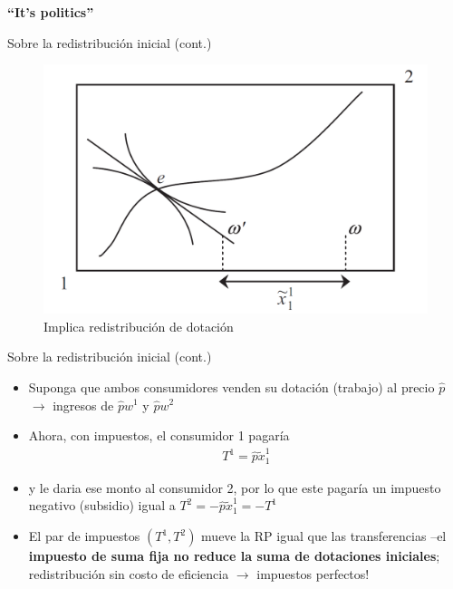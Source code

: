 \documentclass[
  ignorenonframetext,
]{beamer}
\providecommand{\tightlist}{%
  \setlength{\itemsep}{0pt}\setlength{\parskip}{0pt}}\usepackage{longtable,booktabs,array}
\begin{document}
\begin{frame}{\textbf{``It's politics''}}
\begin{block}{Sobre la redistribución inicial (cont.)}
\protect\hypertarget{sobre-la-redistribuciuxf3n-inicial-cont.-3}{}
\begin{figure}

{\centering \includegraphics{fig/fig-01-009.png}

}

\caption{Implica redistribución de dotación}

\end{figure}
\end{block}

\begin{block}{Sobre la redistribución inicial (cont.)}
\protect\hypertarget{sobre-la-redistribuciuxf3n-inicial-cont.-4}{}
\begin{itemize}
\tightlist
\item
  Suponga que ambos consumidores venden su dotación (trabajo) al precio
  \(\hat{p}\) \(\longrightarrow\) ingresos de \(\hat{p}w^{1}\) y
  \(\hat{p}w^{2}\)
\item
  Ahora, con impuestos, el consumidor 1 pagaría \[\begin{aligned}
  T^{1}=\hat{p}\tilde{x}_{1}^{1}
  \end{aligned}\]
\item
  y le daria ese monto al consumidor 2, por lo que este pagaría un
  impuesto negativo (subsidio) igual a
  \(T^2=-\hat{p}\tilde{x}_{1}^{1}=-T^{1}\)
\item
  El par de impuestos \(\left(T^{1},T^{2}\right)\) mueve la RP igual que
  las transferencias --el \textbf{impuesto de suma fija no reduce la
  suma de dotaciones iniciales}; redistribución sin costo de eficiencia
  \(\longrightarrow\) impuestos perfectos!
\end{itemize}
\end{block}


\end{frame}
\end{document}
